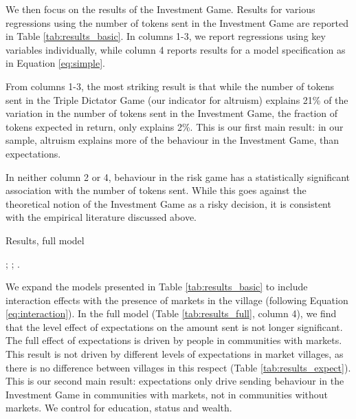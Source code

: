 We then focus on the results of the Investment Game. Results for various regressions using the number of tokens sent in the Investment Game are reported in Table \ref{tab:results_basic}. In columns 1-3, we report regressions using key variables individually, while column 4 reports results for a model specification as in Equation \ref{eq:simple}. 

From columns 1-3, the most striking result is that while the number of tokens sent in the Triple Dictator Game (our indicator for altruism) explains 21\% of the variation in the number of tokens sent in the Investment Game, the fraction of tokens expected in return, only explains 2\%. This is our first main result: in our sample, altruism explains more of the behaviour in the Investment Game, than expectations.

In neither column 2 or 4, behaviour in the risk game has a statistically significant association with the number of tokens sent. While this goes against the theoretical notion of the Investment Game as a risky decision, it is consistent with the empirical literature discussed above.


\begin{threeparttable}[htb]
	\small
	\caption{Results, full model}
	\label{tab:results_full}
	\centering
	
	\begin{tablenotes}
		\footnotesize
		\item \camsig; \camcluster; \camcontrols.
		\item
	\end{tablenotes}
\end{threeparttable}

We expand the models presented in Table \ref{tab:results_basic} to include interaction effects with the presence of markets in the village (following Equation \ref{eq:interaction}). In the full model (Table \ref{tab:results_full}, column 4), we find that the level effect of expectations on the amount sent is not longer significant. The full effect of expectations is driven by people in communities with markets. This result is not driven by different levels of expectations in market villages, as there is no difference between villages in this respect (Table \ref{tab:results_expect}). This is our second main result: expectations only drive sending behaviour in the Investment Game in communities with markets, not in communities without markets. We control for education, status and wealth.


